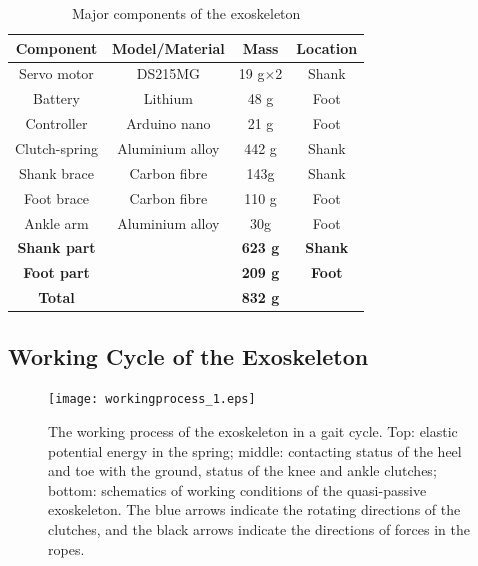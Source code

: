 \documentclass[twocolumn,cleanfoot,10pt]{asme2ej}
\begin{document}
\begin{table}[t]
	\caption{Major components of the exoskeleton}
	\begin{center}
		\label{tab:hardware}
		\begin{tabular}{c c c c}	
			\hline
			\textbf{Component} & \textbf{Model/Material} & \textbf{Mass} & \textbf{Location} \\
			\hline
			Servo motor & DS215MG & 19 g$\times$2 & Shank\\
			Battery & Lithium & 48 g & Foot\\
			Controller & Arduino nano & 21 g & Foot\\
			Clutch-spring & Aluminium alloy & 442 g & Shank\\
			Shank brace & Carbon fibre & 143g & Shank\\
			Foot brace & Carbon fibre & 110 g & Foot\\
			Ankle arm & Aluminium alloy & 30g & Foot\\			
			\hline 
			\textbf{Shank part} & & \textbf{623 g} & \textbf{Shank}\\
			\textbf{Foot part} & & \textbf{209 g} & \textbf{Foot}\\
			\hline
			\textbf{Total} & & \textbf{832 g} & \\
			\hline
		\end{tabular}
	\end{center}
\end{table}


\subsection{Working Cycle of the Exoskeleton}
\label{subsec:Working process}

\begin{figure}[tb]
	\centering
	\texttt{[image: workingprocess\_1.eps]}
	\caption{The working process of the exoskeleton in a gait cycle.
	Top: elastic potential energy in the spring; middle: contacting status of the heel and toe with the ground, status of the knee and ankle clutches; bottom: schematics of working conditions of the quasi-passive exoskeleton.
	The blue arrows indicate the rotating directions of the clutches, and the black arrows indicate the directions of forces in the ropes.}
	\label{fig:workprocess}   
\end{figure}
\end{document}
